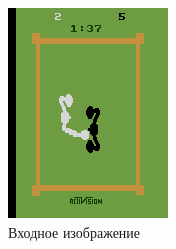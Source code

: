 \documentclass{letask}
\begin{document}
\begin{figure}[H]
\begin{center}
\begin{minipage}[h]{0.4\linewidth}
\includegraphics[width=1\linewidth]{observation.png}
\caption{Входное изображение} 
\label{observation}
\end{minipage}
\hfill
\begin{minipage}[h]{0.4\linewidth}

\end{minipage}
\end{center}
\end{figure}
\end{document}
